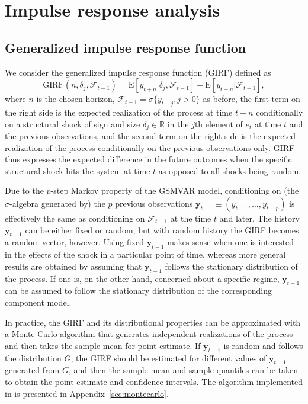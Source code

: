 \documentclass[nojss]{jss}
\begin{document}
\section{Impulse response analysis}\label{sec:impulseresponse}

\subsection{Generalized impulse response function}
We consider the generalized impulse response function (GIRF) \citep{Koop+Pesaran+Potter:1996} defined as
\begin{equation}\label{eq:girf}
\text{GIRF}(n,\delta_j,\mathcal{F}_{t-1}) = \text{E}[y_{t+n}|\delta_j,\mathcal{F}_{t-1}] - \text{E}[y_{t+n}|\mathcal{F}_{t-1}],
\end{equation}
where $n$ is the chosen horizon, $\mathcal{F}_{t-1}=\sigma\lbrace y_{t-j},j>0\rbrace$ as before, the first term on the right side is the expected realization of the process at time $t+n$ conditionally on a structural shock of sign and size $\delta_j \in\mathbb{R}$ in the $j$th element of $e_t$ at time $t$ and the previous observations, and the second term on the right side is the expected realization of the process conditionally on the previous observations only. GIRF thus expresses the expected difference in the future outcomes when the specific structural shock hits the system at time $t$ as opposed to all shocks being random.

Due to the $p$-step Markov property of the GSMVAR model, conditioning on (the $\sigma$-algebra generated by) the $p$ previous observations $\boldsymbol{y}_{t-1}\equiv(y_{t-1},...,y_{t-p})$ is effectively the same as conditioning on $\mathcal{F}_{t-1}$ at the time $t$ and later. The history $\boldsymbol{y}_{t-1}$ can be either fixed or random, but with random history the GIRF becomes a random vector, however. Using fixed $\boldsymbol{y}_{t-1}$ makes sense when one is interested in the effects of the shock in a particular point of time, whereas more general results are obtained by assuming that $\boldsymbol{y}_{t-1}$ follows the stationary distribution of the process. If one is, on the other hand, concerned about a specific regime, $\boldsymbol{y}_{t-1}$ can be assumed to follow the stationary distribution of the corresponding component model.

In practice, the GIRF and its distributional properties can be approximated with a Monte Carlo algorithm that generates independent realizations of the process and then takes the sample mean for point estimate. If $\boldsymbol{y}_{t-1}$ is random and follows the distribution $G$, the GIRF should be estimated for different values of $\boldsymbol{y}_{t-1}$ generated from $G$, and then the sample mean and sample quantiles can be taken to obtain the point estimate and confidence intervals. The algorithm implemented in  is presented in Appendix~\ref{sec:montecarlo}.
\end{document}
